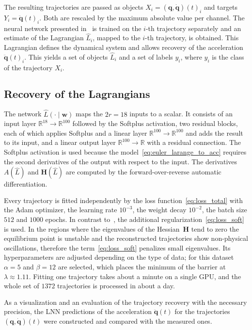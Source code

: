 \documentclass[sn-mathphys-num]{sn-jnl}
\theoremstyle{thmstylethree}
\theoremstyle{thmstyletwo}
\theoremstyle{thmstyleone}
\begin{document}
The resulting trajectories are passed as objects $X_i = (\mathbf{q},\dot{\mathbf{q}})(t)_i$ and targets $Y_i = \ddot{\mathbf{q}}(t)_i$. Both are rescaled by the maximum absolute value per channel. The neural network presented in~\cite{article} is trained on the $i$-th trajectory separately and an estimate of the Lagrangian $\hat{L}_i$, mapped to the $i$-th trajectory, is obtained. This Lagrangian defines the dynamical system and allows recovery of the acceleration $\ddot{\mathbf{q}}(t)_i$. This yields a set of objects $\hat{L}_i$ and a set of labels $y_i$, where $y_i$ is the class of the trajectory $X_i$.

\subsection{Recovery of the Lagrangians}
The network $\hat{L}(\cdot \mid \mathbf{w})$ maps the $2r = 18$ inputs to a scalar. It consists of an input layer $\mathbb{R}^{18} \to \mathbb{R}^{100}$ followed by the Softplus activation, two residual blocks, each of which applies Softplus and a linear layer $\mathbb{R}^{100} \to \mathbb{R}^{100}$ and adds the result to its input, and a linear output layer $\mathbb{R}^{100} \to \mathbb{R}$ with a residual connection. The Softplus activation is used because the model~\eqref{eq:euler_larange_to_acc} requires the second derivatives of the output with respect to the input. The derivatives $A(\hat{L})$ and $\mathbf{H}(\hat{L})$ are computed by the forward-over-reverse automatic differentiation.

Every trajectory is fitted independently by the loss function~\eqref{eq:loss_total} with the Adam optimizer, the learning rate $10^{-3}$, the weight decay $10^{-2}$, the batch size $512$ and $1000$ epochs. In contrast to~\cite{article}, the additional regularization~\eqref{eq:loss_soft} is used. In the regions where the eigenvalues of the Hessian~$\mathbf{H}$ tend to zero the equilibrium point is unstable and the reconstructed trajectories show non-physical oscillations, therefore the term~\eqref{eq:loss_soft} penalizes small eigenvalues. Its hyperparameters are adjusted depending on the type of data; for this dataset $\alpha = 5$ and $\beta = 12$ are selected, which places the minimum of the barrier at $\lambda \approx 1.11$. Fitting one trajectory takes about a minute on a single GPU, and the whole set of $1372$ trajectories is processed in about a day.

As a visualization and an evaluation of the trajectory recovery with the necessary precision, the LNN predictions of the acceleration $\ddot{\mathbf{q}}(t)$ for the trajectories $(\mathbf{q}, \dot{\mathbf{q}})(t)$ were constructed
and compared with the measured ones.
\end{document}

